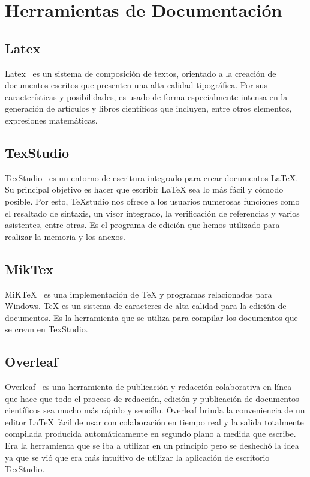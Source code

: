 \section{Herramientas de Documentación}

\subsection{Latex}
 Latex~\cite{latex} es un sistema de composición de textos, orientado a la creación de documentos escritos que presenten una alta calidad tipográfica. Por sus características y posibilidades, es usado de forma especialmente intensa en la generación de artículos y libros científicos que incluyen, entre otros elementos, expresiones matemáticas.
 
\subsection{TexStudio}
TexStudio~\cite{TexStudio} es un entorno de escritura integrado para crear documentos LaTeX. Su principal objetivo es hacer que escribir LaTeX sea lo más fácil y cómodo posible. Por esto, TeXstudio nos ofrece a los usuarios numerosas funciones como el resaltado de sintaxis, un visor integrado, la verificación de referencias y varios asistentes, entre otras. 
Es el programa de edición que hemos utilizado para realizar la memoria y los anexos.

\subsection{MikTex}
MiKTeX~\cite{TexStudio} es una implementación de TeX y programas relacionados para Windows. TeX es un sistema de caracteres de alta calidad para la edición de documentos.
Es la herramienta que se utiliza para compilar los documentos que se crean en TexStudio.

\subsection{Overleaf}
Overleaf~\cite{Overleaf}  es una herramienta de publicación y redacción colaborativa en línea que hace que todo el proceso de redacción, edición y publicación de documentos científicos sea mucho más rápido y sencillo. Overleaf brinda la conveniencia de un editor LaTeX fácil de usar con colaboración en tiempo real y la salida totalmente compilada producida automáticamente en segundo plano a medida que escribe.
Era la herramienta que se iba a utilizar en un principio pero se deshechó la idea ya que se vió que era más intuitivo de utilizar la aplicación de escritorio TexStudio.

